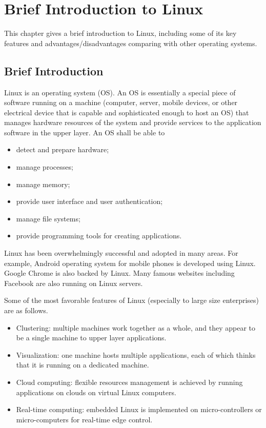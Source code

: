 \chapter{Brief Introduction to Linux}

This chapter gives a brief introduction to Linux, including some of its key features and advantages/disadvantages comparing with other operating systems.

\section{Brief Introduction}

Linux is an operating system (OS). An OS is essentially a special piece of software running on a machine (computer, server, mobile devices, or other electrical device that is capable and sophisticated enough to host an OS) that manages hardware resources of the system and provide services to the application software in the upper layer. An OS shall be able to
\begin{itemize}
  \item detect and prepare hardware;
  \item manage processes;
  \item manage memory;
  \item provide user interface and user authentication;
  \item manage file systems;
  \item provide programming tools for creating applications.
\end{itemize}

Linux has been overwhelmingly successful and adopted in many areas. For example, Android operating system for mobile phones is developed using Linux. Google Chrome is also backed by Linux. Many famous websites including Facebook are also running on Linux servers.

Some of the most favorable features of Linux (especially to large size enterprises) are as follows.
\begin{itemize}
  \item Clustering: multiple machines work together as a whole, and they appear to be a single machine to upper layer applications.
  \item Visualization: one machine hosts multiple applications, each of which thinks that it is running on a dedicated machine.
  \item Cloud computing: flexible resources management is achieved by running applications on clouds on virtual Linux computers.
  \item Real-time computing: embedded Linux is implemented on micro-controllers or micro-computers for real-time edge control.
\end{itemize}

